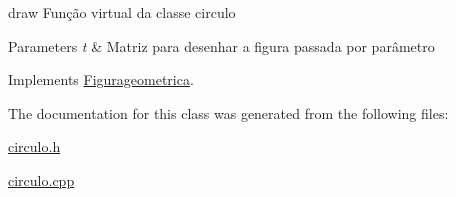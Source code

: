 draw Função virtual da classe circulo 


\begin{DoxyParams}{Parameters}
{\em t} & Matriz para desenhar a figura passada por parâmetro \\
\hline
\end{DoxyParams}


Implements \mbox{\hyperlink{class_figurageometrica_a68d9aba508879bb7a9ea1fe9d1d4f5f4}{Figurageometrica}}.



The documentation for this class was generated from the following files\+:\begin{DoxyCompactItemize}
\item 
\mbox{\hyperlink{circulo_8h}{circulo.\+h}}\item 
\mbox{\hyperlink{circulo_8cpp}{circulo.\+cpp}}\end{DoxyCompactItemize}

